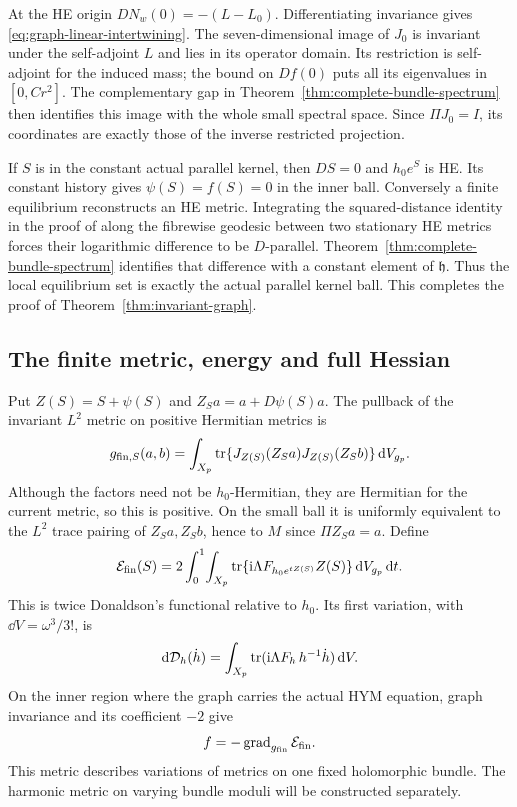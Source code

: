 At the HE origin $DN_w(0)=-(L-L_0)$.
Differentiating invariance gives
\eqref{eq:graph-linear-intertwining}.
The seven-dimensional image of $J_0$ is invariant under
the self-adjoint $L$ and lies in its operator domain.
Its restriction is self-adjoint for the induced mass;
the bound on $Df(0)$ puts all its eigenvalues in $[0,Cr^2]$.
The complementary gap in Theorem~\ref{thm:complete-bundle-spectrum}
then identifies this image with the whole small spectral
space. Since $\Pi J_0=I$, its coordinates are exactly
those of the inverse restricted projection.

If $S$ is in the constant actual parallel kernel, then
$DS=0$ and $h_0e^S$ is HE. Its constant history gives
$\psi(S)=f(S)=0$ in the inner ball. Conversely a finite
equilibrium reconstructs an HE metric. Integrating the
squared-distance identity in the proof of
\cite[Lemma 6.4.5]{Kobayashi} along the fibrewise geodesic
between two stationary HE metrics forces their logarithmic
difference to be $D$-parallel. Theorem~\ref{thm:complete-bundle-spectrum}
identifies that difference with a constant element of
$\mathfrak h$. Thus the local equilibrium set is exactly
the actual parallel kernel ball. This completes the proof
of Theorem~\ref{thm:invariant-graph}.

\subsection{The finite metric, energy and full Hessian}

Put $Z(S)=S+\psi(S)$ and $Z_Sa=a+D\psi(S)a$.
The pullback of the invariant $L^2$ metric on positive
Hermitian metrics is
\begin{equation}\label{eq:finite-flow-metric}
 g_{{\rm fin},S}(a,b)=\int_{X_p}\operatorname{tr}
             \{J_{Z(S)}(Z_Sa)J_{Z(S)}(Z_Sb)\}\,\mathrm d V_{g_p}.
\end{equation}
Although the factors need not be $h_0$-Hermitian, they
are Hermitian for the current metric, so this is positive.
On the small ball it is uniformly equivalent to the
$L^2$ trace pairing of $Z_Sa,Z_Sb$, hence to $M$ since
$\Pi Z_Sa=a$.
Define
\begin{equation}\label{eq:finite-donaldson-energy}
 \mathcal E_{\rm fin}(S)=
 2\int_0^1\!\int_{X_p}
       \operatorname{tr}\{\mathrm i\Lambda F_{h_0e^{tZ(S)}}Z(S)\}
                                      \,\mathrm d V_{g_p}\,\mathrm d t.
\end{equation}
This is twice Donaldson's functional relative to $h_0$.
Its first variation, with $\dd V=\omega^3/3!$, is
\cite[Section 6.3, equations (6.3.25)--(6.3.27)]{Kobayashi}
\[
 \mathrm d\mathcal D_h(\dot h)=\int_{X_p}
                      \operatorname{tr}(\mathrm i\Lambda F_h\,h^{-1}\dot h)\,\mathrm d V.
\]
On the inner region where the graph carries the actual HYM
equation, graph invariance and its coefficient $-2$ give
\begin{equation}\label{eq:exact-finite-gradient}
                f=-\operatorname{grad}_{g_{\rm fin}}\mathcal E_{\rm fin}.
\end{equation}
This metric describes variations of metrics on one fixed
holomorphic bundle. The harmonic metric on varying bundle
moduli will be constructed separately.

